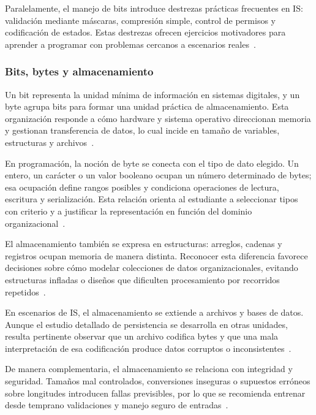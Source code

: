 \documentclass[12pt,twoside]{book}
\begin{document}
					Paralelamente, el manejo de bits introduce destrezas prácticas frecuentes en IS: validación mediante máscaras, compresión simple, control de permisos y codificación de estados. Estas destrezas ofrecen ejercicios motivadores para aprender a programar con problemas cercanos a escenarios reales~\cite{Wirth1976Algorithms,Manzano2017Programacion,Hanly2015Problem}.
					
					\subsubsection{Bits, bytes y almacenamiento}
						\noindent
						Un bit representa la unidad mínima de información en sistemas digitales, y un byte agrupa bits para formar una unidad práctica de almacenamiento. Esta organización responde a cómo hardware y sistema operativo direccionan memoria y gestionan transferencia de datos, lo cual incide en tamaño de variables, estructuras y archivos~\cite{Tanenbaum2021Structured,Silberschatz2018Operating,Laudon2020Management}.
						
						En programación, la noción de byte se conecta con el tipo de dato elegido. Un entero, un carácter o un valor booleano ocupan un número determinado de bytes; esa ocupación define rangos posibles y condiciona operaciones de lectura, escritura y serialización. Esta relación orienta al estudiante a seleccionar tipos con criterio y a justificar la representación en función del dominio organizacional~\cite{Gaddis2022Starting,Hanly2015Problem,Sebesta2018Concepts}.
						
						El almacenamiento también se expresa en estructuras: arreglos, cadenas y registros ocupan memoria de manera distinta. Reconocer esta diferencia favorece decisiones sobre cómo modelar colecciones de datos organizacionales, evitando estructuras infladas o diseños que dificulten procesamiento por recorridos repetidos~\cite{Wirth1976Algorithms,Sedgewick2011Algorithms,Manzano2017Programacion}.
						
						En escenarios de IS, el almacenamiento se extiende a archivos y bases de datos. Aunque el estudio detallado de persistencia se desarrolla en otras unidades, resulta pertinente observar que un archivo codifica bytes y que una mala interpretación de esa codificación produce datos corruptos o inconsistentes~\cite{Date2019Database,Elmasri2016Database,Silberschatz2020Database}.
						
						De manera complementaria, el almacenamiento se relaciona con integridad y seguridad. Tamaños mal controlados, conversiones inseguras o supuestos erróneos sobre longitudes introducen fallas previsibles, por lo que se recomienda entrenar desde temprano validaciones y manejo seguro de entradas~\cite{ISO247722024Programming,Ghezzi2003Fundamentals,Pressman2019Software}.
						
\end{document}
